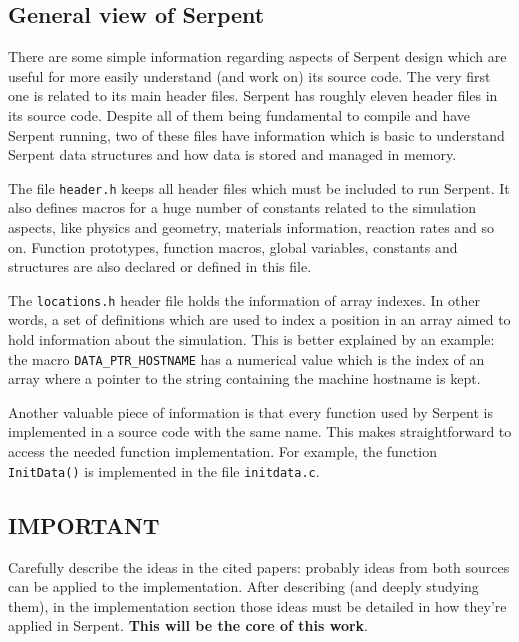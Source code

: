 \documentclass[twoside,a4paper,12pt,english,draft]{anstrans}
\begin{document}

\subsection{General view of Serpent}

There are some simple information regarding aspects of Serpent design which are
useful for more easily understand (and work on) its source code. The very first one is related to its
main header files. Serpent has roughly eleven header files in its source code. Despite all of them
being fundamental to compile and have Serpent running, two of these files have information which
is basic to understand Serpent data structures and how data is stored and managed in memory.

The file \texttt{header.h} keeps all header files which must be included to run Serpent.
It also defines macros for a huge number of constants related to the simulation aspects, like
physics and geometry, materials information, reaction rates and so on. Function prototypes, function
macros, global variables, constants and structures are also declared or defined in this file.

The \texttt{locations.h} header file holds the information of array indexes. In other words, a set of
definitions which are used to index a position in an array aimed to hold information about the simulation.
This is better explained by an example: the macro \texttt{DATA\_PTR\_HOSTNAME} has a numerical value
which is the index of an array where a pointer to the string containing the machine hostname is kept.

Another valuable piece of information is that every function used by Serpent
is implemented in a source code with the same name. This makes straightforward to access the needed
function implementation. For example, the function \texttt{InitData()} is implemented in the file
\texttt{initdata.c}.

\subsection{IMPORTANT}
Carefully describe the ideas in the cited papers: probably ideas from both sources can be applied to
the implementation. After describing (and deeply studying them), in the implementation section those
ideas must be detailed in how they're applied in Serpent. \textbf{This will be the core of this work}.
\end{document}
